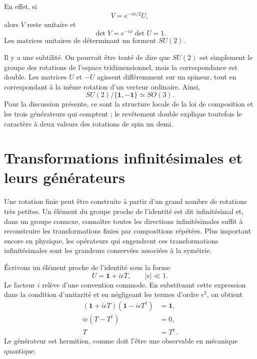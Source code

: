 \begin{classroomqa}
\end{classroomqa}

En effet, si
\begin{equation}
V=e^{-i\phi/2}U,
\end{equation}
alors \(V\) reste unitaire et
\begin{equation}
\det V=e^{-i\phi}\det U=1.
\end{equation}
Les matrices unitaires de déterminant un forment \(SU(2)\).

Il y a une subtilité. On pourrait être tenté de dire que \(SU(2)\) est simplement le groupe des rotations de l’espace tridimensionnel, mais la correspondance est double. Les matrices \(U\) et \(-U\) agissent différemment sur un spineur, tout en correspondant à la même rotation d’un vecteur ordinaire. Ainsi,
\begin{equation}
SU(2)/\{\boldsymbol 1,-\boldsymbol 1\}\simeq SO(3).
\end{equation}
Pour la discussion présente, ce sont la structure locale de la loi de composition et les trois générateurs qui comptent ; le revêtement double explique toutefois le caractère à deux valeurs des rotations de spin un demi.

\section{Transformations infinitésimales et leurs générateurs}

Une rotation finie peut être construite à partir d’un grand nombre de rotations très petites. Un élément du groupe proche de l’identité est dit infinitésimal et, dans un groupe connexe, connaître toutes les directions infinitésimales suffit à reconstruire les transformations finies par compositions répétées. Plus important encore en physique, les opérateurs qui engendrent ces transformations infinitésimales sont les grandeurs conservées associées à la symétrie.

Écrivons un élément proche de l’identité sous la forme
\begin{equation}
U=\boldsymbol 1+i\epsilon T,
\qquad |\epsilon|\ll1.
\label{eq:l4-infinitesimal-u}
\end{equation}
Le facteur \(i\) relève d’une convention commode. En substituant cette expression dans la condition d’unitarité et en négligeant les termes d’ordre \(\epsilon^2\), on obtient
\begin{align}
(\boldsymbol 1+i\epsilon T)
(\boldsymbol 1-i\epsilon T^\dagger)&=\boldsymbol 1,
\\
i\epsilon(T-T^\dagger)&=0,
\\
T&=T^\dagger.
\label{eq:l4-hermitian-generator}
\end{align}
Le générateur est hermitien, comme doit l’être une observable en mécanique quantique.

